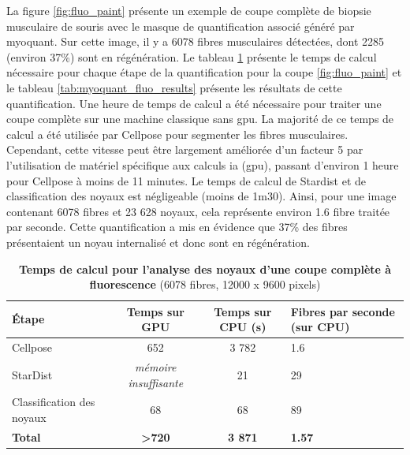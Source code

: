 La figure \ref{fig:fluo_paint} présente un exemple de coupe complète de biopsie musculaire de souris avec le masque de quantification associé généré par \gls{myoquant}. Sur cette image, il y a 6078 fibres musculaires détectées, dont 2285 (environ 37\%) sont en régénération. Le tableau \ref{tab:myoquant_fluo_time} présente le temps de calcul nécessaire pour chaque étape de la quantification pour la coupe \ref{fig:fluo_paint} et le tableau \ref{tab:myoquant_fluo_results} présente les résultats de cette quantification. Une heure de temps de calcul a été nécessaire pour traiter une coupe complète sur une machine classique sans \gls{gpu}. La majorité de ce temps de calcul a été utilisée par Cellpose pour segmenter les fibres musculaires. Cependant, cette vitesse peut être largement améliorée d'un facteur 5 par l'utilisation de matériel spécifique aux calculs \gls{ia} (\gls{gpu}), passant d’environ 1 heure pour Cellpose à moins de 11 minutes. Le temps de calcul de Stardist et de classification des noyaux est négligeable (moins de 1m30). Ainsi, pour une image contenant 6078 fibres et 23 628 noyaux, cela représente environ 1.6 fibre traitée par seconde. Cette quantification a mis en évidence que 37\% des fibres présentaient un noyau internalisé et donc sont en régénération.
\begin{table}[!ht]
\centering
\caption[Temps de calcul pour l'analyse des noyaux d'une coupe complète à fluorescence]{\textbf{Temps de calcul pour l'analyse des noyaux d'une coupe complète à fluorescence} (6078 fibres, 12000 x 9600 pixels)}
\label{tab:myoquant_fluo_time}
\begin{tabularx}{\textwidth}{|l|c|c|X|}
\hline
\textbf{Étape} & \textbf{Temps sur GPU} & \textbf{Temps sur CPU (s)} & \textbf{Fibres par seconde (sur CPU)} \\
\hline
Cellpose & 652 & 3 782 & 1.6 \\
\hline
StarDist & \textit{mémoire insuffisante} & 21 & 29 \\
\hline
Classification des noyaux & 68 & 68 & 89 \\
\hline
\textbf{Total} & \textbf{>720} & \textbf{3 871} & \textbf{1.57} \\
\hline
\end{tabularx}
\end{table}

